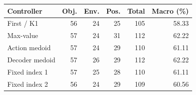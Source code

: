 \begin{tabular}{lrrrrr}
\toprule
Controller & Obj. & Env. & Pos. & Total & Macro (\%) \\
\midrule
First / K1 & 56 & 24 & 25 & 105 & 58.33 \\
Max-value & 57 & 24 & 31 & 112 & 62.22 \\
Action medoid & 57 & 24 & 29 & 110 & 61.11 \\
Decoder medoid & 57 & 26 & 29 & 112 & 62.22 \\
Fixed index 1 & 57 & 25 & 28 & 110 & 61.11 \\
Fixed index 2 & 56 & 24 & 29 & 109 & 60.56 \\
\bottomrule
\end{tabular}
